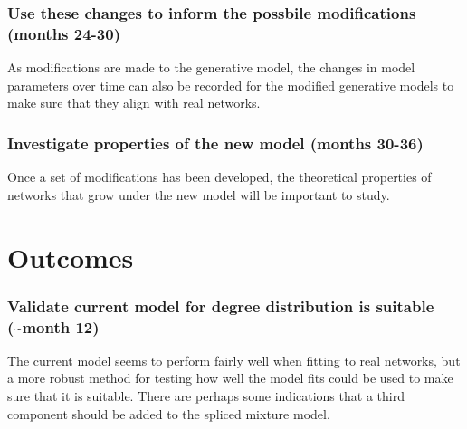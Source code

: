 \documentclass[
  10pt,
  a4paper,
]{scrreprt}
\theoremstyle{definition}
\theoremstyle{plain}
\theoremstyle{plain}
\theoremstyle{remark}
\begin{document}
{\hypertarget{use-these-changes-to-inform-the-possbile-modifications-months-24-30}{%
\subsubsection*{Use these changes to inform the possbile modifications
(months
24-30)}\label{use-these-changes-to-inform-the-possbile-modifications-months-24-30}}

As modifications are made to the generative model, the changes in model
parameters over time can also be recorded for the modified generative
models to make sure that they align with real networks.

\hypertarget{investigate-properties-of-the-new-model-months-30-36}{%
\subsubsection*{Investigate properties of the new model (months
30-36)}\label{investigate-properties-of-the-new-model-months-30-36}}

Once a set of modifications has been developed, the theoretical
properties of networks that grow under the new model will be important
to study.

\hypertarget{outcomes}{%
\section{Outcomes}\label{outcomes}}

\hypertarget{validate-current-model-for-degree-distribution-is-suitable-month-12}{%
\subsubsection*{Validate current model for degree distribution is
suitable (\textasciitilde month
12)}\label{validate-current-model-for-degree-distribution-is-suitable-month-12}}

The current model seems to perform fairly well when fitting to real
networks, but a more robust method for testing how well the model fits
could be used to make sure that it is suitable. There are perhaps some
indications that a third component should be added to the spliced
mixture model.

}
\end{document}
